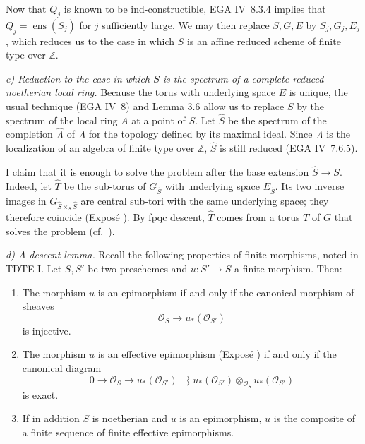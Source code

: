 Now that \(Q_j\) is known to be ind-constructible, EGA IV~8.3.4
implies that \(Q_j=\operatorname{ens}(S_j)\) for \(j\) sufficiently
large. We may then replace \(S,G,E\) by \(S_j,G_j,E_j\), which
reduces us to the case in which \(S\) is an affine reduced scheme of
finite type over \(\mathbb Z\).

\smallskip
\noindent\textit{c) Reduction to the case in which \(S\) is the
spectrum of a complete reduced noetherian local ring.}\quad
Because the torus with underlying space \(E\) is unique, the usual
technique (EGA IV~8) and Lemma 3.6 allow us to replace \(S\) by the
spectrum of the local ring \(A\) at a point of \(S\). Let
\(\widehat S\) be the spectrum of the completion \(\widehat A\) of
\(A\) for the topology defined by its maximal ideal. Since \(A\) is
the localization of an algebra of finite type over \(\mathbb Z\),
\(\widehat S\) is still reduced (EGA IV~7.6.5).

I claim that it is enough to solve the problem after the base
extension \(\widehat S\to S\). Indeed, let \(\widehat T\) be the
sub-torus of \(G_{\widehat S}\) with underlying space
\(E_{\widehat S}\). Its two inverse images in
\(G_{\widehat S\times_S\widehat S}\) are central sub-tori with the
same underlying space; they therefore coincide
(Exposé ). By fpqc descent, \(\widehat T\) comes from a
torus \(T\) of \(G\) that solves the problem (cf.\ ).

\smallskip
\noindent\textit{d) A descent lemma.}\quad
Recall the following properties of finite morphisms, noted in
TDTE I. Let \(S,S'\) be two preschemes and
\(u:S'\to S\) a finite morphism. Then:
\begin{enumerate}
\item[\normalfont\SGAInlineRefTarget{sga3:xv:lemma:3:6:item:1}(1)] The morphism \(u\) is an epimorphism if and
only if the canonical morphism of sheaves
\[
  \mathcal O_S\longrightarrow u_*(\mathcal O_{S'})
\]
is injective.
\item[\normalfont(2)] The morphism \(u\) is an effective
epimorphism (Exposé ) if and only if the canonical diagram
\[
  0\longrightarrow\mathcal O_S
  \longrightarrow u_*(\mathcal O_{S'})
  \rightrightarrows
  u_*(\mathcal O_{S'})\otimes_{\mathcal O_S}u_*(\mathcal O_{S'})
\]
is exact.
\item[\normalfont\SGAInlineRefTarget{sga3:xv:lemma:3:6:item:3}(3)] If in addition \(S\) is noetherian and \(u\)
is an epimorphism, \(u\) is the composite of a finite sequence of
finite effective epimorphisms.
\end{enumerate}

